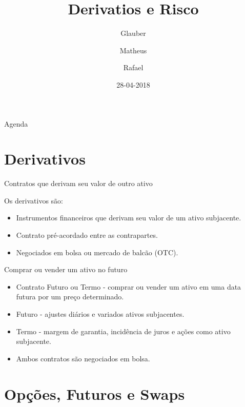 \documentclass[ignorenonframetext,]{beamer}
\title{Derivatios e Risco}
\author{Glauber \and Matheus \and Rafael}
\date{28-04-2018}
\begin{document}
\frame{\titlepage}

\section[]{}
\begin{frame}{Agenda}
  \tableofcontents
\end{frame}

\section{Derivativos}\label{derivativos}

\begin{frame}{Contratos que derivam seu valor de outro ativo}

Os derivativos são:

\begin{itemize}
\item
  Instrumentos financeiros que derivam seu valor de um ativo subjacente.
\item
  Contrato pré-acordado entre as contrapartes.
\item
  Negociados em bolsa ou mercado de balcão (OTC).
\end{itemize}

\end{frame}

\begin{frame}{Comprar ou vender um ativo no futuro}

\begin{itemize}
\item
  Contrato Futuro ou Termo - comprar ou vender um ativo em uma data
  futura por um preço determinado.
\item
  Futuro - ajustes diários e variados ativos subjacentes.
\item
  Termo - margem de garantia, incidência de juros e ações como ativo
  subjacente.
\item
  Ambos contratos são negociados em bolsa.
\end{itemize}

\end{frame}

\section{Opções, Futuros e Swaps}\label{opcoes-futuros-e-swaps}
\end{document}

